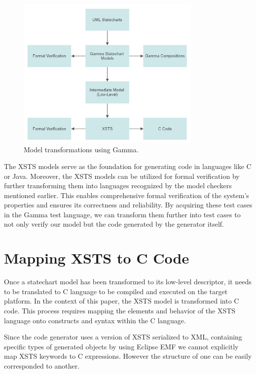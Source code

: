 \begin{figure}[h]
	\centering
	\includegraphics[width=0.8\textwidth]{images/transformation.png}
	\caption{Model transformations using Gamma.}
	\label{fig:transformation}
\end{figure}

The XSTS models serve as the foundation for generating code in languages like C or Java. Moreover, the XSTS models can be utilized for formal verification by further transforming them into languages recognized by the model checkers mentioned earlier. This enables comprehensive formal verification of the system's properties and ensures its correctness and reliability. By acquiring these test cases in the Gamma test language, we can transform them further into test cases to not only verify our model but the code generated by the generator itself.

\section{Mapping XSTS to C Code}

Once a statechart model has been transformed to its low-level descriptor, it needs to be translated to C language to be compiled and executed on the target platform. In the context of this paper, the XSTS model is transformed into C code. This process requires mapping the elements and behavior of the XSTS language onto constructs and syntax within the C language. 

Since the code generator uses a version of XSTS serialized to XML, containing specific types of generated objects by using Eclipse EMF we cannot explicitly map XSTS keywords to C expressions. However the structure of one can be easily corresponded to another. 

